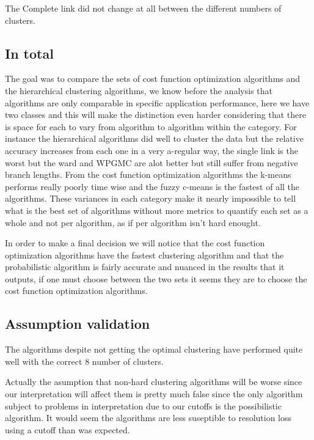 \documentclass[12pt, a4paper]{article}
\begin{document}
The Complete link did not change at all between the different numbers of clusters.
\newline

\subsection{In total}

The goal was to compare the sets of cost function optimization algorithms and the hierarchical clustering algorithms, we know before the analysis that algorithms are only comparable in specific application performance, here we have two classes and this will make the distinction even harder considering that there is space for each to vary from algorithm to algorithm within the category. For instance the hierarchical algorithms did well to cluster the data but the relative accuracy increases from each one in a very a-regular way, the single link is the worst but the ward and WPGMC are alot better but still suffer from negative branch lengths. From the cost function optimization algorithms the k-means performs really poorly time wise and the fuzzy c-means is the fastest of all the algorithms. These variances in each category make it nearly impossible to tell what is the best set of algorithms without more metrics to quantify each set as a whole and not per algorithm, as if per algorithm isn't hard enought.
\newline

In order to make a final decision we will notice that the cost function optimization algorithms have the fastest clustering algorithm and that the probabilistic algorithm is fairly accurate and nuanced in the results that it outputs, if one must choose between the two sets it seems they are to choose the cost function optimization algorithms.
\newline

\subsection{Assumption validation}

The algorithms despite not getting the optimal clustering have performed quite well with the correct $8$ number of clusters.
\newline

Actually the asumption that non-hard clustering algorithms will be worse since our interpretation will affect them is pretty much false since the only algorithm subject to problems in interpretation due to our cutoffs is the possibilistic algorithm. It would seem the algorithms are less suseptible to resolution loss using a cutoff than was expected.
\newline
\end{document}
